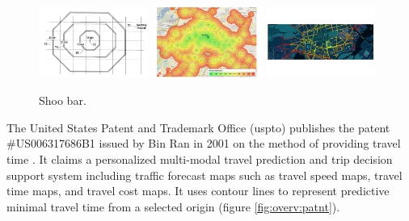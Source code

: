     \begin{figure}[t]
      {\includegraphics[width=0.32\textwidth]{./img/overv-patnt.png}}
      \hfill
      {\includegraphics[width=0.32\textwidth]{./img/overv-berln.png}}
      \hfill
      {\includegraphics[width=0.32\textwidth]{./img/overv-potsd.png}}
      \caption{Shoo bar.}
      \label{fig:overv:2}
    \end{figure}

    The United States Patent and Trademark Office (\acrshort{uspto}) publishes
    the patent \#US006317686B1 issued by Bin Ran in 2001 on the method of
    providing travel time \cite{ran2001method}. It claims a personalized
    multi-modal travel prediction and trip decision support system including
    traffic forecast maps such as travel speed maps, travel time maps, and
    travel cost maps. It uses contour lines to represent predictive minimal
    travel time from a selected origin (figure \ref{fig:overv:patnt}).\par


